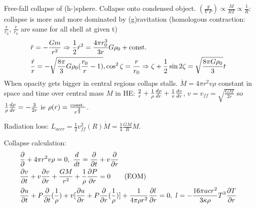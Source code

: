 \begin{frame}{Free-fall collapse of (h-)sphere. Collapse onto condensed object.}
$(\frac{g}{\nabla P})\propto\frac{M}{RT}\propto\frac{1}{R}$: collapse is more and more dominated by (g)ravitation (homologous contraction: $\frac{r}{r_0}$, $\frac{\dot{r}}{r_0}$ are same for all shell at given t)
\begin{align*}
&\ddot{r}=-\frac{Gm}{r^2}\Rightarrow\frac{1}{2}\dot{r}^2=\frac{4\pi r_0^3}{3r}G\rho_0+\const{}\\
&\frac{\dot{r}}{r}=-\sqrt{\frac{8\pi}{3}G\rho_0(\frac{r_0}{r}-1)},\cos^2{\zeta}=\frac{r}{r_0}\Rightarrow \zeta+\frac{1}{2}\sin{2\zeta}=\sqrt{\frac{8\pi G\rho_0}{3}}t
\end{align*}
When opacity gets bigger in central regions collaps stalls. $\dot{M}=4\pi r^2v\rho$ constant in space and time over central mass $M$ in HE: $\frac{2}{r}+\frac{1}{\rho}\TDy{r}{\rho}+\frac{1}{v}\TDy{r}{v}$, $v=v_{ff}=\sqrt{\frac{GM}{2r}}$ so $\frac{1}{\rho}\TDy{r}{\rho}=-\frac{3}{2r}$ ie $\rho(r)=\frac{\const{}}{r^{\frac{3}{2}}}$.

Radiation loss: $L_{accr}=\frac{1}{2}v_{ff}^2(R)\dot{M}=\frac{1}{4}\frac{GM}{R}\dot{M}$.

Collapse calculation:
\begin{align*}
&\PDy{}{}+4\pi r^2v\rho=0,\ \TDof{t}=\PDof{t}+v\PDof{r}\\
&\PDy{t}{v}+v\PDy{r}{v}+\frac{GM}{r^2}+\frac{1}{\rho}\PDy{r}{P}=0\tag{EOM}\\
&\PDy{t}{u}+P\PDof{t}(\frac{1}{\rho})+v[\PDy{r}{u}+P\PDof{r}(\frac{1}{\rho})]+\frac{1}{4\pi\rho r^2}\PDy{r}{l}=0,\ l=-\frac{16\pi acr^2}{3\kappa\rho}T^3\PDy{r}{T}
\end{align*}
\end{frame}

